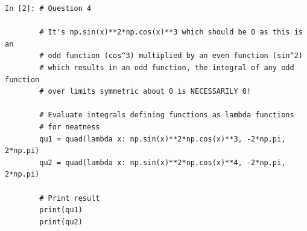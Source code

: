 \begin{lstlisting}[style=PY]
In [2]: # Question 4

        # It's np.sin(x)**2*np.cos(x)**3 which should be 0 as this is an 
        # odd function (cos^3) multiplied by an even function (sin^2) 
        # which results in an odd function, the integral of any odd function 
        # over limits symmetric about 0 is NECESSARILY 0!
        
        # Evaluate integrals defining functions as lambda functions 
        # for neatness
        qu1 = quad(lambda x: np.sin(x)**2*np.cos(x)**3, -2*np.pi, 2*np.pi)
        qu2 = quad(lambda x: np.sin(x)**2*np.cos(x)**4, -2*np.pi, 2*np.pi)
        
        # Print result
        print(qu1)
        print(qu2)
\end{lstlisting}
